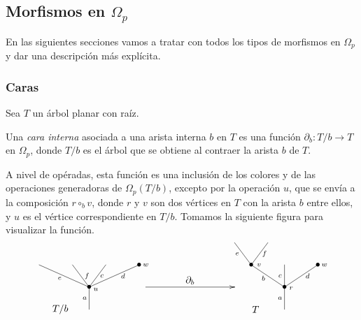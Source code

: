 \documentclass[../main.tex]{subfiles}
\begin{document}
\subsection{Morfismos en $\Omega_p$}
En las siguientes secciones vamos a tratar con todos los tipos de morfismos en $\Omega_p$ y dar una descripci\'on m\'as expl\'icita.
\subsubsection{Caras}
Sea $T$ un \'arbol planar con ra\'iz.
\begin{defi}
    Una \emph{cara interna} asociada a una arista interna $b$ en $T$ es una funci\'on $\partial_b \colon T/b\to T$ en $\Omega_p$, donde $T/b$ es el \'arbol que se obtiene al contraer la arista $b$ de $T$.

    A nivel de op\'eradas, esta funci\'on es una inclusi\'on de los colores y de las operaciones generadoras de $\Omega_p(T/b)$, excepto por la operaci\'on $u$, que se env\'ia a la composici\'on $r\circ_b v$,
    donde $r$ y $v$ son dos v\'ertices en $T$ con la arista $b$ entre ellos, y $u$ es el v\'ertice correspondiente en $T/b$. Tomamos la siguiente figura para visualizar la funci\'on.
    \begin{equation}
        \xy
        <0.08cm, 0cm>:
        (0.0, 0.0)*{}="1"; %
        (0.0, 10.0)*=0{\bullet}="2"; %
        (-22.5, 20.0)*{}="3"; %
        (-7.5, 20.0)*{}="4"; %
        (7.5, 20.0)*{}="5"; %
        (22.5, 20.0)*=0{\bullet}="6"; %
        "1";"2" **\dir{-};
        "2";"3" **\dir{-};
        "2";"4" **\dir{-};
        "2";"5" **\dir{-};
        "2";"6" **\dir{-};
        (3.0, 9.0)*=0{\scriptstyle u};
        (25.5, 20.0)*=0{\scriptstyle w};
        (-2.0, 5.0)*=0{\scriptstyle a};
        (-13.25, 14.0)*=0{\scriptstyle e};
        (-1, 15.0)*=0{\scriptstyle f};
        (5.75, 15.0)*=0{\scriptstyle c};
        (15.25, 15.0)*=0{\scriptstyle d};
        (-13,0)*{T/b};
        \endxy
        \xy
        <0.08cm, 0cm>:
        (-20, 0.0)*{}="1";
        (20, 0.0)*{}="2";
        (20, 10)*{}="3";
        (-20, 10)*{}="4";
        {\ar(-20, 10)*{};(20,10)*{}};
        (0,13)*{\partial_b};
        \endxy
        \xy
        <0.08cm, 0cm>:
        (0.0, 0.0)*{}="1"; %
        (0.0, 10.0)*=0{\bullet}="2"; %
        (-15.0, 20.0)*=0{\bullet}="3"; %
        (-22.5, 30.0)*{}="4"; %
        (-7.5, 30.0)*{}="5"; %
        (0.0, 20.0)*{}="6"; %
        (15.0, 20.0)*=0{\bullet}="7"; %
        "1";"2" **\dir{-};
        "2";"3" **\dir{-};
        "3";"4" **\dir{-};
        "3";"5" **\dir{-};
        "2";"6" **\dir{-};
        "2";"7" **\dir{-};
        (3.0, 9.5)*=0{\scriptstyle r};
        (-11.5, 20.0)*=0{\scriptstyle v};
        (-2.0, 5.0)*=0{\scriptstyle a};
        (-9.5, 14.0)*=0{\scriptstyle b};
        (-21.3, 25.0)*=0{\scriptstyle e};
        (-9, 25.0)*=0{\scriptstyle f};
        (-2.0, 15.0)*=0{\scriptstyle c};
        (10.4, 15.0)*=0{\scriptstyle d};
        (18.0, 20.0)*=0{\scriptstyle w};
        (-13,0)*{T};
        \endxy
    \end{equation}
\end{defi}
\end{document}
